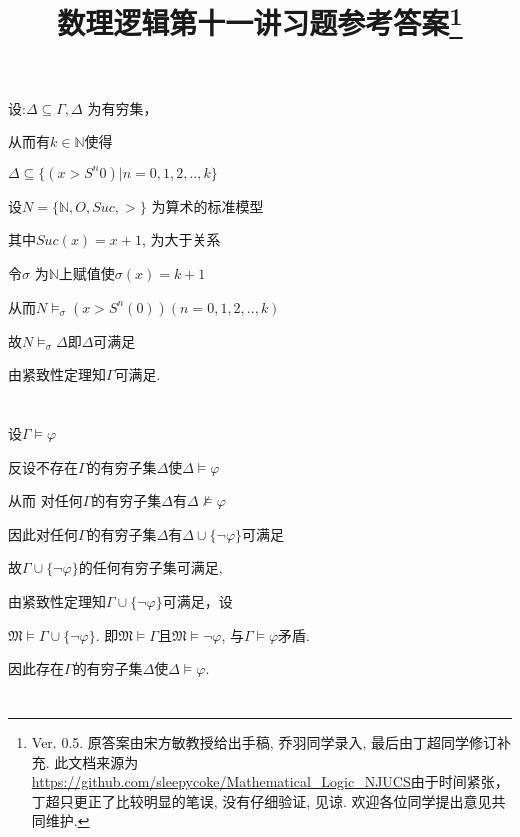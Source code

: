 \documentclass{article}
\begin{document}
\title{数理逻辑第十一讲习题参考答案\footnote{Ver. 0.5. 原答案由宋方敏教授给出手稿, 乔羽同学录入, 最后由丁超同学修订补充. 此文档来源为\url{https://github.com/sleepycoke/Mathematical_Logic_NJUCS}由于时间紧张，丁超只更正了比较明显的笔误, 没有仔细验证, 见谅. 
 欢迎各位同学提出意见共同维护. 
}}
\maketitle

\section{}

设:$\Delta \subseteq \Gamma, \Delta$ 为有穷集，

从而有$k \in \mathbb{N} $使得

$\Delta \subseteq \{ (x > S^n0) | n=0,1,2,..,k\}$

设$N = \{ \mathbb{N},O,Suc , >  \}$ 为算术的标准模型

其中$ Suc (x) =x+1 $, $ $为大于关系

令$\sigma$ 为$\mathbb{N}$上赋值使$\sigma (x) = k+1$

从而$N \vDash_\sigma (x>S^n(0))(n=0,1,2,..,k)$

故$N \vDash_\sigma \Delta$即$\Delta$可满足

由紧致性定理知$\Gamma$可满足.

\section{}


设$\Gamma \vDash \varphi$

反设不存在$\Gamma$的有穷子集$\Delta$使$\Delta \vDash \varphi$

从而 对任何$\Gamma$的有穷子集$\Delta$有$\Delta \nvDash \varphi$

因此对任何$\Gamma$的有穷子集$\Delta$有$\Delta \cup \{\neg \varphi\}$可满足

故$\Gamma \cup \{\neg \varphi\}$的任何有穷子集可满足,

由紧致性定理知$\Gamma \cup \{\neg \varphi\}$可满足，设

$\mathfrak{M} \vDash \Gamma \cup\{\neg \varphi\}$. 即$\mathfrak{M} \vDash \Gamma$且$\mathfrak{M} \vDash \neg\varphi$, 与$\Gamma \models \varphi$矛盾. 

因此存在$\Gamma$的有穷子集$\Delta$使$\Delta \models \varphi$. 

\section{}
\end{document}
